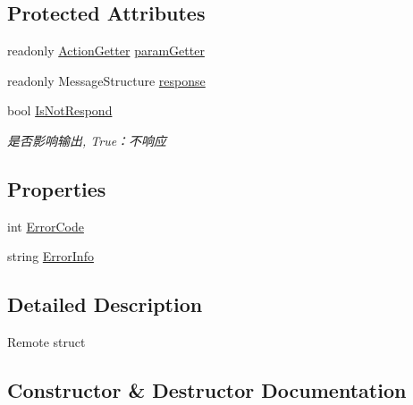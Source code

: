 \subsection*{Protected Attributes}
\begin{DoxyCompactItemize}
\item 
readonly \mbox{\hyperlink{class_t_net_1_1_service_1_1_action_getter}{Action\+Getter}} \mbox{\hyperlink{class_t_net_1_1_service_1_1_remote_struct_aa28ecde1dab94de21f6da421afbafc4c}{param\+Getter}}
\item 
readonly Message\+Structure \mbox{\hyperlink{class_t_net_1_1_service_1_1_remote_struct_a1759bb0f1f894a8bcd48d8277330d57e}{response}}
\item 
bool \mbox{\hyperlink{class_t_net_1_1_service_1_1_remote_struct_a165a18173bdc8a5f996b52e722fedff6}{Is\+Not\+Respond}}
\begin{DoxyCompactList}\small\item\em 是否影响输出, True：不响应 \end{DoxyCompactList}\end{DoxyCompactItemize}
\subsection*{Properties}
\begin{DoxyCompactItemize}
\item 
int \mbox{\hyperlink{class_t_net_1_1_service_1_1_remote_struct_ad338c82b3b71c4efd256c5917235fb6f}{Error\+Code}}
\item 
string \mbox{\hyperlink{class_t_net_1_1_service_1_1_remote_struct_adc032929cd29262d5070b3ab0d078ecc}{Error\+Info}}
\end{DoxyCompactItemize}


\subsection{Detailed Description}
Remote struct 



\subsection{Constructor \& Destructor Documentation}
\mbox{\label{class_t_net_1_1_service_1_1_remote_struct_a8a7dc68ea6f1c71c7c59c099c981fede}} 
